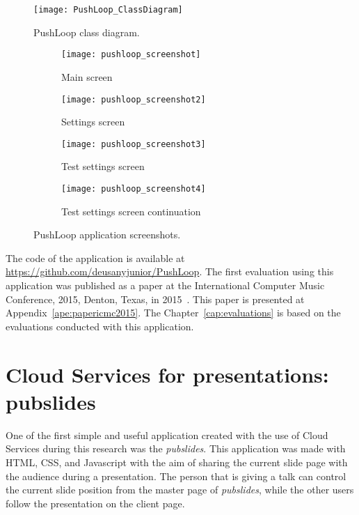 \begin{figure}[!ht]
\centering
\texttt{[image: PushLoop\_ClassDiagram]}
\caption{PushLoop class diagram.}
\label{fig:pushloopclassdiagram}
\end{figure}

\begin{figure*}[!ht]
\centering
\begin{subfigure}{.20\textwidth}
	\texttt{[image: pushloop\_screenshot]}
    \caption{Main screen}
	\label{fig:pushloopss1}
\end{subfigure}
\begin{subfigure}{.20\textwidth}
	\texttt{[image: pushloop\_screenshot2]}
	\caption{Settings screen}
	\label{fig:pushloopss2}
\end{subfigure}
\begin{subfigure}{.20\textwidth}
	\texttt{[image: pushloop\_screenshot3]}
	\caption{Test settings screen}
	\label{fig:pushloopss3}
\end{subfigure}
\begin{subfigure}{.20\textwidth}
	\texttt{[image: pushloop\_screenshot4]}
	\caption{Test settings screen continuation}
	\label{fig:pushloopss4}
\end{subfigure}

\caption{PushLoop application screenshots.}
\label{fig:pushloopscreenshots}
\end{figure*}

The code of the application is available at \url{https://github.com/deusanyjunior/PushLoop}. 
The first evaluation using this application was published as a paper at the International Computer Music Conference, 2015, Denton, Texas, in 2015~\citep{deCarvalhoJunior2015computer}.
This paper is presented at Appendix~\ref{ape:papericmc2015}.
The Chapter~\ref{cap:evaluations} is based on the evaluations conducted with this application.


\section{Cloud Services for presentations: pubslides}
\label{sec:apppubslides}

One of the first simple and useful application created with the use of Cloud Services during this research was the \textit{pubslides}.
This application was made with HTML, CSS, and Javascript with the aim of sharing the current slide page with the audience during a presentation.
The person that is giving a talk can control the current slide position from the master page of \textit{pubslides}, while the other users follow the presentation on the client page.

